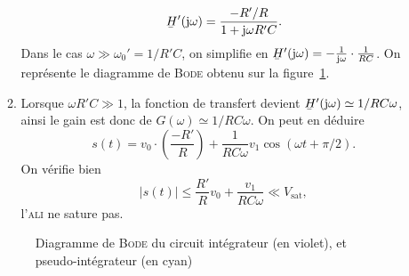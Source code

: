 \begin{enumerate}
\begin{enumerate}
\[					\ubar{H}'(\mathrm{j}\omega) = \frac{-R' / R}{1 + \mathrm{j}\omega R'C}
				.\]
				Dans le cas $\omega \gg \omega_0' = 1 / R' C$, on simplifie en $\ubar{H}'(\mathrm{j}\omega) = - \frac{1}{\mathrm{j} \omega} \cdot  \frac{1}{RC}$.
				On représente le diagramme de \textsc{Bode} obtenu sur la figure~\ref{fig:bode-ali}.
			\item Lorsque $\omega R' C \gg 1$, la fonction de transfert devient $\ubar{H}'(\mathrm{j}\omega) \simeq 1 / RC \omega$, ainsi le gain est donc de $G(\omega) \simeq 1 / RC\omega$.
				On peut en déduire \[
					s(t) = v_0 \cdot \left( \frac{-R'}{R} \right) + \frac{1}{RC\omega} v_1 \cos(\omega t + \pi/2)
				.\]
				On vérifie bien \[
					|s(t)| \le  \frac{R'}{R} v_0 + \frac{v_1}{RC\omega} \ll V_\mathrm{sat}
				,\] l'\textsc{ali} ne sature pas.
		\end{enumerate}
		\begin{figure}[H]
			\centering
			
			\caption{Diagramme de \textsc{Bode} du circuit intégrateur (en violet), et pseudo-intégrateur (en cyan)}
			\label{fig:bode-ali}
		\end{figure}
\end{enumerate}

